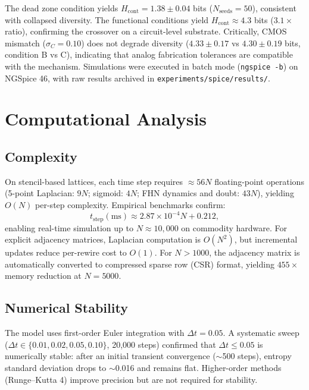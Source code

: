 ﻿\documentclass[11pt]{article}
\begin{document}
The dead zone condition yields $H_{\text{cont}} = 1.38 \pm 0.04$ bits ($N_{\text{seeds}}=50$), consistent with collapsed diversity. The functional conditions yield $H_{\text{cont}} \approx 4.3$ bits ($3.1\times$ ratio), confirming the crossover on a circuit-level substrate. Critically, CMOS mismatch ($\sigma_C = 0.10$) does not degrade diversity ($4.33 \pm 0.17$ vs $4.30 \pm 0.19$ bits, condition B vs C), indicating that analog fabrication tolerances are compatible with the mechanism. Simulations were executed in batch mode (\texttt{ngspice -b}) on NGSpice 46, with raw results archived in \texttt{experiments/spice/results/}.

\section{Computational Analysis}
\label{sec:comp_analysis}

\subsection{Complexity}

On stencil-based lattices, each time step requires $\approx 56N$ floating-point operations (5-point Laplacian: $9N$; sigmoid: $4N$; FHN dynamics and doubt: $43N$), yielding $O(N)$ per-step complexity. Empirical benchmarks confirm:
\begin{equation}
t_{\text{step}}(\text{ms}) \approx 2.87 \times 10^{-4} N + 0.212,
\label{eq:scaling}
\end{equation}
enabling real-time simulation up to $N \approx 10{,}000$ on commodity hardware. For explicit adjacency matrices, Laplacian computation is $O(N^2)$, but incremental updates reduce per-rewire cost to $O(1)$. For $N > 1000$, the adjacency matrix is automatically converted to compressed sparse row (CSR) format, yielding $455\times$ memory reduction at $N = 5000$.

\subsection{Numerical Stability}

The model uses first-order Euler integration with $\Delta t = 0.05$. A systematic sweep ($\Delta t \in \{0.01, 0.02, 0.05, 0.10\}$, 20{,}000 steps) confirmed that $\Delta t \leq 0.05$ is numerically stable: after an initial transient convergence ($\sim$500 steps), entropy standard deviation drops to $\sim$0.016 and remains flat. Higher-order methods (Runge--Kutta 4) improve precision but are not required for stability.
\end{document}
